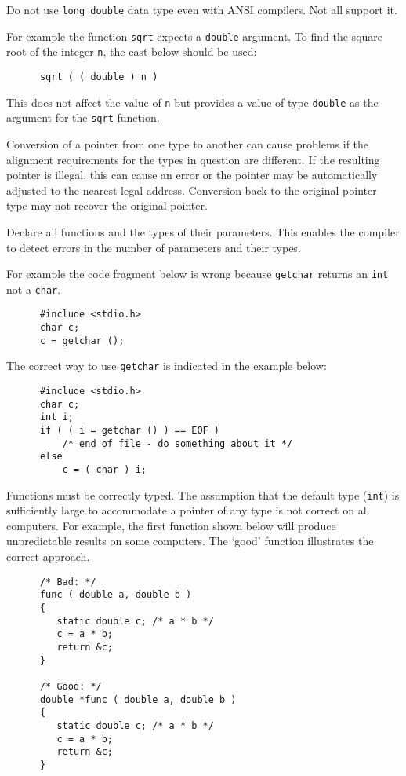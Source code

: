 Do not use {\tt long double} data type even with ANSI compilers. Not all 
support it.

For example the function {\tt sqrt} expects a {\tt double} argument.
To find the square root of the integer {\tt n}, the cast below should be 
used:
\begin{verbatim}
      sqrt ( ( double ) n )
\end{verbatim}
This does not affect the value of {\tt n} but provides a value of type 
{\tt double} as the argument for the {\tt sqrt} function.


Conversion of a pointer from one type to another can cause problems if the 
alignment requirements for the types in question are different.
If the resulting pointer is illegal, this can cause an error or the pointer 
may be automatically adjusted to the nearest legal address.
Conversion back to the original pointer type may not recover the original
pointer.

Declare all functions and the types of their parameters.  This enables the 
compiler to detect errors in the number of parameters and their types.

For example the code fragment below is wrong because {\tt getchar} returns 
an {\tt int} not a {\tt char}.
\begin{verbatim}
      #include <stdio.h>
      char c;
      c = getchar ();
\end{verbatim}
The correct way to use {\tt getchar} is indicated in the example below:
\begin{verbatim}
      #include <stdio.h>
      char c;
      int i;
      if ( ( i = getchar () ) == EOF )
          /* end of file - do something about it */
      else
          c = ( char ) i;                                  
\end{verbatim}

Functions must be correctly typed.
The assumption that the default
type ({\tt int}) is sufficiently large to accommodate a pointer of any
type is not correct on all computers. 
For example,  the first function shown below will produce unpredictable
results on some computers. 
The `good' function illustrates the correct approach.
\begin{verbatim}
      /* Bad: */
      func ( double a, double b )
      {
         static double c; /* a * b */
         c = a * b;
         return &c;
      }

      /* Good: */
      double *func ( double a, double b )
      {
         static double c; /* a * b */
         c = a * b;
         return &c;
      }
\end{verbatim}

